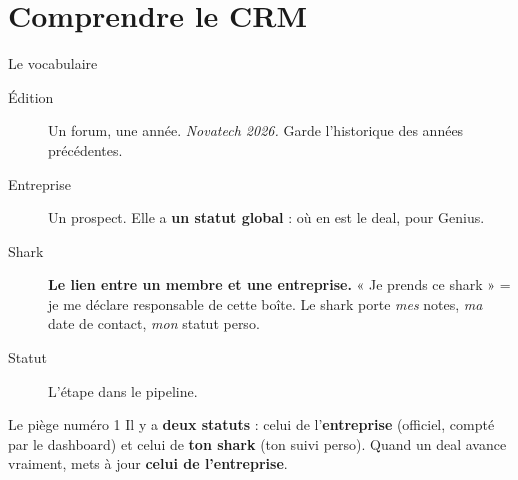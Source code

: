 \documentclass[aspectratio=169,11pt]{beamer}
\newcommand{\cle}[1]{\textbf{\textcolor{noirApp}{#1}}}
\begin{document}
\section{Comprendre le CRM}

\begin{frame}{Le vocabulaire}
  \small
  \begin{description}
    \item[Édition] Un forum, une année. \emph{Novatech 2026.} Garde
          l'historique des années précédentes.
    \item[Entreprise] Un prospect. Elle a \cle{un statut global} : où en est le
          deal, pour Genius.
    \item[Shark] \cle{Le lien entre un membre et une entreprise.} « Je prends
          ce shark » = je me déclare responsable de cette boîte. Le shark porte
          \emph{mes} notes, \emph{ma} date de contact, \emph{mon} statut perso.
    \item[Statut] L'étape dans le pipeline.
  \end{description}

  \vfill
  \begin{alertblock}{Le piège numéro 1}
    Il y a \textbf{deux statuts} : celui de l'\textbf{entreprise} (officiel,
    compté par le dashboard) et celui de \textbf{ton shark} (ton suivi perso).
    Quand un deal avance vraiment, mets à jour \textbf{celui de l'entreprise}.
  \end{alertblock}
\end{frame}
\end{document}
